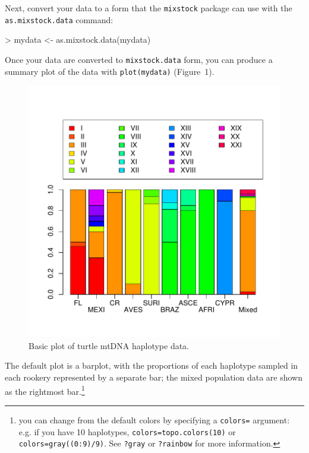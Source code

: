 \documentclass[11pt]{article}
\begin{document}
Next, convert your data to a form that the {\tt mixstock}
package can use with the \verb+as.mixstock.data+ command:
\begin{Schunk}
\begin{Sinput}
> mydata <- as.mixstock.data(mydata)
\end{Sinput}
\end{Schunk}

Once your data are converted to {\tt mixstock.data} form,
you can produce a summary plot of the data
with {\tt plot(mydata)} (Figure~1).
\begin{figure}
\includegraphics{mixstock-009}
\caption{Basic plot of turtle mtDNA haplotype data.}
\label{fig:data1}
\end{figure}

The default plot is a barplot, with the proportions of each haplotype
sampled in each rookery represented by a separate bar; the mixed
population data are shown as the rightmost bar.\footnote{you can
change from the default colors by specifying a {\tt colors=} argument:
e.g. if you have 10 haplotypes, {\tt colors=topo.colors(10)} or
{\tt colors=gray((0:9)/9)}. See {\tt ?gray} or {\tt ?rainbow} for
more information.}
\end{document}
